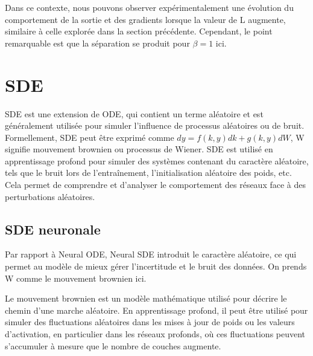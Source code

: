 
Dans ce contexte, nous pouvons observer expérimentalement une évolution du comportement de la sortie et des gradients lorsque la valeur de L augmente, similaire à celle explorée dans la section précédente.  Cependant, le point remarquable est que la séparation se produit pour $\beta = 1$ ici.

\section{SDE}
SDE est une extension de ODE, qui contient un terme aléatoire et est généralement utilisée pour simuler l'influence de processus aléatoires ou de bruit. Formellement, SDE peut être exprimé comme $dy = f(k,y)dk + g(k,y)dW $, W signifie mouvement brownien ou processus de Wiener. 
SDE est utilisé en apprentissage profond pour simuler des systèmes contenant du caractère aléatoire, tels que le bruit lors de l'entraînement, l'initialisation aléatoire des poids, etc. Cela permet de comprendre et d'analyser le comportement des réseaux face à des perturbations aléatoires.

\subsection{SDE neuronale}
Par rapport à Neural ODE, Neural SDE introduit le caractère aléatoire, ce qui permet au modèle de mieux gérer l'incertitude et le bruit des données.
On prends W comme le mouvement brownien ici.

Le mouvement brownien est un modèle mathématique utilisé pour décrire le chemin d'une marche aléatoire. En apprentissage profond, il peut être utilisé pour simuler des fluctuations aléatoires dans les mises à jour de poids ou les valeurs d'activation, en particulier dans les réseaux profonds, où ces fluctuations peuvent s'accumuler à mesure que le nombre de couches augmente.


